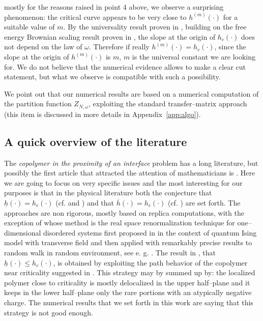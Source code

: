 \documentclass[reqno,11pt]{amsart}
\numberwithin{equation}{section}
\newcommand{\go}{\omega}
\begin{document}
\begin{enumerate}
 mostly for the reasons raised in point 4 above, we observe
 a surprising phenomenon: the critical curve appears to be  very close
 to $h^{(m)}(\cdot)$ for a suitable value of $m$. By the universality
 result proven in \cite{cf:GT}, building on the free energy Brownian scaling result proven
 in \cite{cf:BdH}, the slope at the origin of $h_c(\cdot)$ does not depend on the law of $\go$.
 Therefore if really $h^{(m)}(\cdot)= h_c (\cdot)$, since the slope at the origin
 of $h^{(m)}(\cdot)$ is $m$,
 $m$ is the  universal constant we are looking for.
 We do not believe that the numerical evidence
 allows to make a clear cut  statement, but what we observe is compatible
 with such a possibility.
 \end{enumerate}

We point out that our numerical results are based on a numerical computation of the partition function $Z_{N,\go}$, exploiting the standard transfer--matrix approach (this item is discussed in more details in Appendix~\ref{app:algo}).

\subsection{A quick  overview of the literature}
\label{sec:overv}

The {\sl copolymer in the proximity of an interface} problem
has a long literature, but possibly the first article that attracted the attention
of mathematicians is \cite{cf:GHLO}.
Here we are going to
focus on very specific issues and the most interesting for our purposes
is that in the physical literature both the conjecture that $\underline{h}(\cdot)=
h_c (\cdot)$ (cf. \cite{cf:Monthus} and \cite{cf:SSE})  and that $\overline{h}(\cdot)=
h_c (\cdot)$  (cf. \cite{cf:TM}) are set forth.
The approaches are non rigorous, mostly based on replica computations,
with the exception of \cite{cf:Monthus} whose method is the real space renormalization
technique for one--dimensional disordered systems first proposed in \cite{cf:Fisher}
in the context of quantum Ising model with transverse field
and then applied with remarkably precise results to random walk in random environment,
see e. g. \cite{cf:LDMF99}.
The result in \cite{cf:BG2}, that $\underline{h} (\cdot) \le h_c (\cdot)$,
is obtained by exploiting the path behavior of the copolymer near criticality
suggested in   \cite{cf:Monthus}. This strategy may by summed up by:
the localized polymer close to criticality is mostly delocalized
in the upper half--plane and it keeps in the lower half--plane
only the rare portions with an atypically negative charge.
The numerical results that we set forth in this work are saying that
this strategy is not good enough.
\end{document}
